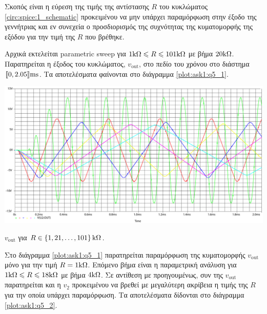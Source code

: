 Σκοπός είναι η εύρεση της τιμής της αντίστασης $R$ του κυκλώματος \ref{circ:spice:1_schematic} προκειμένου να μην υπάρχει παραμόρφωση στην έξοδο της γεννήτριας και εν συνεχεία ο προσδιορισμός της συχνότητας της κυματομορφής της εξόδου για την τιμή της $R$ που βρέθηκε.\par
Αρχικά εκτελείται parametric sweep για $1\kohm\leqslant R\leqslant 101\kohm$ με βήμα $20\kohm$. Παρατηρείται η έξοδος του κυκλώματος, $v_{\mathrm{out}}$, στο πεδίο του χρόνου στο διάστημα $\lb 0,2.05 \rb\unit{\milli\second}$. Τα αποτελέσματα φαίνονται στο διάγραμμα \ref{plot:ask1:q5_1}.

\begin{plot_fig}[H]
	\begin{center}
		\includegraphics[width=15cm]{spice_01/q5_1.pdf}
		\caption{$v_{\mathrm{out}}$ για $R\in\left\{1,21,\ldots,101\right\}\kohm$.}
		\label{plot:ask1:q5_1}
	\end{center}
\end{plot_fig}

Στο διάγραμμα \ref{plot:ask1:q5_1} παρατηρείται παραμόρφωση της κυματομορφής $v_{\mathrm{out}}$ μόνο για την τιμή $R=1\kohm$. Επόμενο βήμα είναι η παραμετρική ανάλυση για $1\kohm\leqslant R\leqslant 18\kohm$ με βήμα $4\kohm$. Σε αντίθεση με προηγουμένως, συν της $v_{\mathrm{out}}$ παρατηρείται και η $v_2$ προκειμένου να βρεθεί με μεγαλύτερη ακρίβεια η τιμής της $R$ για την οποία υπάρχει παραμόρφωση. Τα αποτελέσματα δίδονται στο διάγραμμα \ref{plot:ask1:q5_2}.

